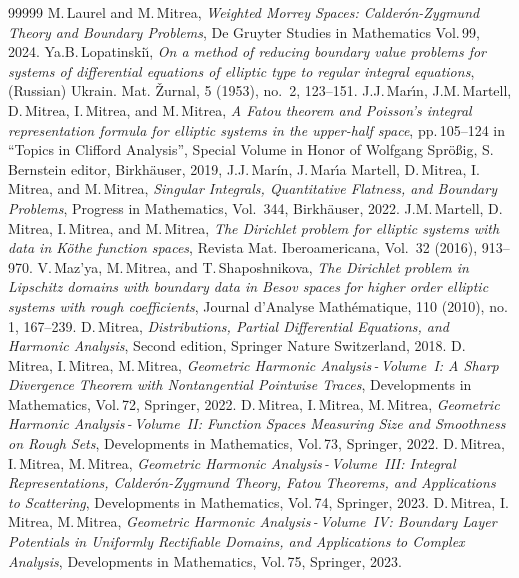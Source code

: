 \documentclass[11pt,reqno]{amsart}
\numberwithin{equation}{section}
\theoremstyle{remark}
\begin{document}
\begin{thebibliography}{99999}
%
 M.\,Laurel and M.\,Mitrea, {\it Weighted Morrey Spaces: Calder\'on-Zygmund Theory and 
Boundary Problems}, De Gruyter Studies in Mathematics Vol.\,99, 2024.
%
 Ya.B.\,Lopatinski\u{\i}, {\it On a method of reducing boundary value problems for systems 
of differential equations of elliptic type to regular integral equations}, (Russian) Ukrain. Mat. 
\v{Z}urnal, 5 (1953), no.~2, 123--151. 
%
 J.J.\,Mar{\'\i}n, J.M.\,Martell, D.\,Mitrea, I.\,Mitrea, and M.\,Mitrea,
{\it A Fatou theorem and Poisson's integral representation formula for elliptic systems in the upper-half space}, 
pp.\,105--124 in ``Topics in Clifford Analysis'', Special Volume in Honor of Wolfgang Spr\"oßig, 
S.\,Bernstein editor, Birkh\"auser, 2019,
%
 J.J.\,Mar\'{i}n, J.\,Mar{\'\i}a Martell, D.\,Mitrea, I.\,Mitrea, and M.\,Mitrea, 
{\it Singular Integrals, Quantitative Flatness, and Boundary Problems}, Progress in Mathematics, Vol.~344, Birkh\"auser, 2022.
%
 J.M.\,Martell, D.\,Mitrea, I.\,Mitrea, and M.\,Mitrea, {\it The Dirichlet 
problem for elliptic systems with data in K\"othe function spaces}, Revista Mat. Iberoamericana, 
Vol.~32 (2016), 913--970.
%
 V.\,Maz'ya, M.\,Mitrea, and T.\,Shaposhnikova, {\it The Dirichlet
problem in Lipschitz domains with boundary data in Besov spaces for higher order 
elliptic systems with rough coefficients}, Journal d'Analyse Math\'ematique, 
110 (2010), no.\,1, 167--239.
%
 D.\,Mitrea, {\it Distributions, Partial Differential Equations,
and Harmonic Analysis}, Second edition, Springer Nature Switzerland, 2018.
%
 D.\,Mitrea, I.\,Mitrea, M.\,Mitrea, 
{\it Geometric Harmonic Analysis\,-\,Volume~I: A Sharp Divergence Theorem with Nontangential Pointwise Traces}, 
Developments in Mathematics, Vol.\,72, Springer, 2022.
%
 D.\,Mitrea, I.\,Mitrea, M.\,Mitrea, 
{\it Geometric Harmonic Analysis\,-\,Volume~II: Function Spaces Measuring Size and Smoothness on Rough Sets}, 
Developments in Mathematics, Vol.\,73, Springer, 2022.
%
 D.\,Mitrea, I.\,Mitrea, M.\,Mitrea, 
{\it Geometric Harmonic Analysis\,-\,Volume~III: Integral Representations, Calder\'{o}n-Zygmund Theory, Fatou Theorems, 
and Applications to Scattering}, Developments in Mathematics, Vol.\,74, Springer, 2023.
%
 D.\,Mitrea, I.\,Mitrea, M.\,Mitrea, 
{\it Geometric Harmonic Analysis\,-\,Volume~IV: Boundary Layer Potentials in Uniformly Rectifiable Domains, 
and Applications to Complex Analysis}, Developments in Mathematics, Vol.\,75, Springer, 2023.

\end{thebibliography}
\end{document}
